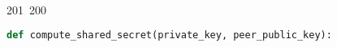 201~200~\documentclass{article}
\begin{document}
	                                                                                                                                                                                                                                                                                                	                                                                                                                                        	    	                                                                                                	                                                                                                                                                                                                                                                                                                                                	                                                                        	                                                                        	                                                                                                                                        	                                                                                                                                                                                                            \begin{lstlisting}[language=Python, caption=Shared Secret Computation and Encryption Key Derivation]
	                                                                                                                                                                                                                                                                                                	                                                                                                                                        	    	                                                                                                	                                                                                                                                                                                                                                                                                                                                	                                                                        	                                                                        	                                                                                                                                        	                                                                                                                                                                                                            def compute_shared_secret(private_key, peer_public_key):

\end{lstlisting}
\end{document}
